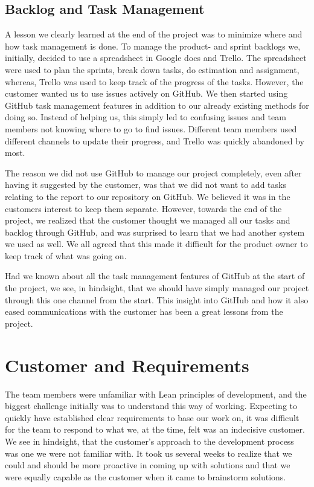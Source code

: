 \subsection{Backlog and Task Management}
A lesson we clearly learned at the end of the project was to minimize where and how task management is done. 
To manage the product- and sprint backlogs we, initially, decided to use a spreadsheet in Google docs and Trello. The spreadsheet were used to plan the sprints, break down tasks, do estimation and assignment, whereas, Trello was used to keep track of the progress of the tasks. However, the customer wanted us to use issues actively on GitHub. We then started using GitHub task management features in addition to our already existing methods for doing so. Instead of helping us, this simply led to confusing issues and team members not knowing where to go to find issues. Different team members used different channels to update their progress, and Trello was quickly abandoned by most.

The reason we did not use GitHub to manage our project completely, even after having it suggested by the customer, was that we did not want to add tasks relating to the report to our repository on GitHub. We believed it was in the customers interest to keep them separate. However, towards the end of the project, we realized that the customer thought we managed all our tasks and backlog through GitHub, and was surprised to learn that we had another system we used as well. We all agreed that this made it difficult for the product owner to keep track of what was going on. 

Had we known about all the task management features of GitHub at the start of the project, we see, in hindsight, that we should have simply managed our project through this one channel from the start. This insight into GitHub and how it also eased communications with the customer has been a great lessons from the project.
\section{Customer and Requirements}
The team members were unfamiliar with Lean principles of development, and the biggest challenge initially was to understand this way of working. Expecting to quickly have established clear requirements to base our work on, it was difficult for the team to respond to what we, at the time, felt was an indecisive customer. We see in hindsight, that the customer's approach to the development process was one we were not familiar with. It took us several weeks to realize that we could and should be more proactive in coming up with solutions and that we were equally capable as the customer when it came to brainstorm solutions.

